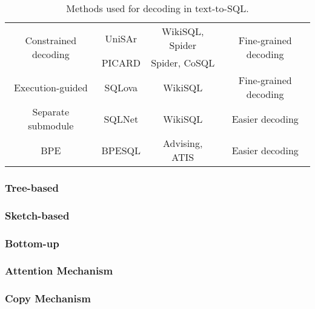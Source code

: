 \begin{table}
\begin{tabular}{|c|c|c|c|}
        \multirow{2}{*}{Constrained decoding}                      & UniSAr              & WikiSQL, Spider           & \multirow{2}{*}{Fine-grained decoding}                                                   \\
                                                                   & PICARD              & Spider, CoSQL
                                                                   &                                                                                                                                            \\
        \hline
        Execution-guided                                           & SQLova              & WikiSQL                   & Fine-grained decoding                                                                    \\
        \hline
        Separate submodule                                         & SQLNet              & WikiSQL                   & Easier decoding                                                                          \\
        \hline
        BPE                                                        & BPESQL              & Advising, ATIS
                                                                   & Easier decoding
        \\
        \hline
    \end{tabular}
    \caption{Methods used for decoding in text-to-SQL.}
    \label{tab:decoders}
\end{table}

\subsubsection{Tree-based}

\subsubsection{Sketch-based}

\subsubsection{Bottom-up}

\subsubsection{Attention Mechanism}

\subsubsection{Copy Mechanism}

